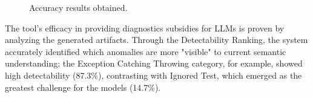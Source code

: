 \documentclass[sigconf]{acmart}
\begin{document}
\begin{figure}[htb]
    \centering
    \footnotesize
    \label{fig:nosesenseresults}
    \caption{Accuracy results obtained.}
    \label{fig:grafico_modelos}
    \vspace{-10px}
\end{figure}

The tool's efficacy in providing diagnostics subsidies for LLMs is proven by analyzing the generated artifacts. Through the Detectability Ranking, the system accurately identified which anomalies are more "visible" to current semantic understanding; the Exception Catching Throwing category, for example, showed high detectability (87.3\%), contrasting with Ignored Test, which emerged as the greatest challenge for the models (14.7\%).
\end{document}
